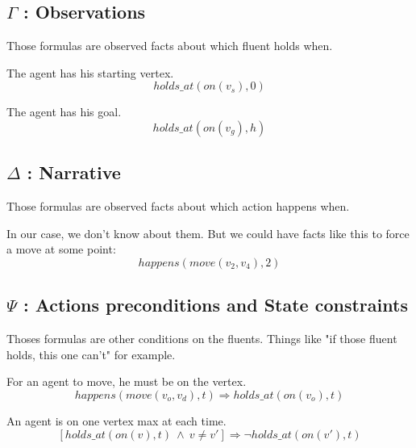 \subsection{$\Gamma$ : Observations}

Those formulas are observed facts about which fluent holds when.

The agent has his starting vertex.
\begin{equation}
  \tag{$\Gamma_i$}
  holds\_at(on(v_s),0)
\end{equation}

The agent has his goal.
\begin{equation}
  \tag{$\Gamma_f$}
  holds\_at(on(v_g),h)
\end{equation}

\subsection{$\Delta$ : Narrative}

Those formulas are observed facts about which action happens when.

In our case, we don't know about them. But we could have facts like this to force a move at some point:
\begin{equation}
  \tag{$example$}
  happens(move(v_2,v_4),2)
\end{equation}

\subsection{$\Psi$ : Actions preconditions and State constraints}

Thoses formulas are other conditions on the fluents. Things like "if those fluent holds, this one can't" for example.

For an agent to move, he must be on the vertex.
\begin{equation}
  \tag{$\Psi$.1}
  happens(move(v_o,v_d),t) \Rightarrow holds\_at(on(v_o),t)
\end{equation}

An agent is on one vertex max at each time.
\begin{equation}
  \tag{$\Psi$.2}
  [holds\_at(on(v),t)\ \land\ v\neq v']\Rightarrow \neg holds\_at(on(v'),t)
\end{equation}

\iffalse
A vertex has place for one agent only at each time.
\begin{equation}
  \tag{$\Psi$.3}
  [holds\_at(on(r,v),t)\ \land\ r\neq r']\Rightarrow \neg holds\_at(on(r',v),t)
\end{equation}
\fi

